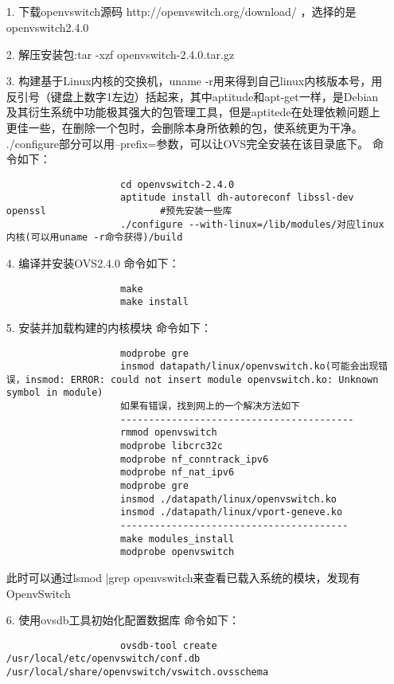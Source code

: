 \documentclass[a4paper,left=1.5cm,right=1.5cm,11pt]{article}
\begin{document}
\tableofcontents

\clearpage

\subsection{}
	\begin{itemize}
        \item[1.]下载openvswitch源码 http://openvswitch.org/download/ ，选择的是openvswitch2.4.0
		\item[2.]解压安装包:tar -xzf openvswitch-2.4.0.tar.gz
		\item[3.]构建基于Linux内核的交换机，uname -r用来得到自己linux内核版本号，用反引号（键盘上数字1左边）括起来，其中aptitude和apt-get一样，是Debian及其衍生系统中功能极其强大的包管理工具，但是aptitede在处理依赖问题上更佳一些，在删除一个包时，会删除本身所依赖的包，使系统更为干净。
                 ./configure部分可以用--prefix=参数，可以让OVS完全安装在该目录底下。
				 命令如下：
				 \begin{lstlisting}
					cd openvswitch-2.4.0
					aptitude install dh-autoreconf libssl-dev openssl                    #预先安装一些库
					./configure --with-linux=/lib/modules/对应linux内核(可以用uname -r命令获得)/build
				 \end{lstlisting}
		\item[4.]编译并安装OVS2.4.0
		         命令如下：
				 \begin{lstlisting}
					make
					make install
				 \end{lstlisting}
		\item[5.]安装并加载构建的内核模块
				 命令如下：
				 \begin{lstlisting}
					modprobe gre
					insmod datapath/linux/openvswitch.ko(可能会出现错误，insmod: ERROR: could not insert module openvswitch.ko: Unknown symbol in module)
					如果有错误，找到网上的一个解决方法如下
					-----------------------------------------
					rmmod openvswitch
					modprobe libcrc32c
					modprobe nf_conntrack_ipv6
					modprobe nf_nat_ipv6
					modprobe gre
					insmod ./datapath/linux/openvswitch.ko
					insmod ./datapath/linux/vport-geneve.ko
					----------------------------------------
					make modules_install
					modprobe openvswitch
				 \end{lstlisting}
				 此时可以通过lsmod |grep openvswitch来查看已载入系统的模块，发现有OpenvSwitch
		\item[6.]使用ovsdb工具初始化配置数据库
				命令如下：
				 \begin{lstlisting}
					ovsdb-tool create /usr/local/etc/openvswitch/conf.db /usr/local/share/openvswitch/vswitch.ovsschema

\end{lstlisting}
\end{itemize}
\end{document}
